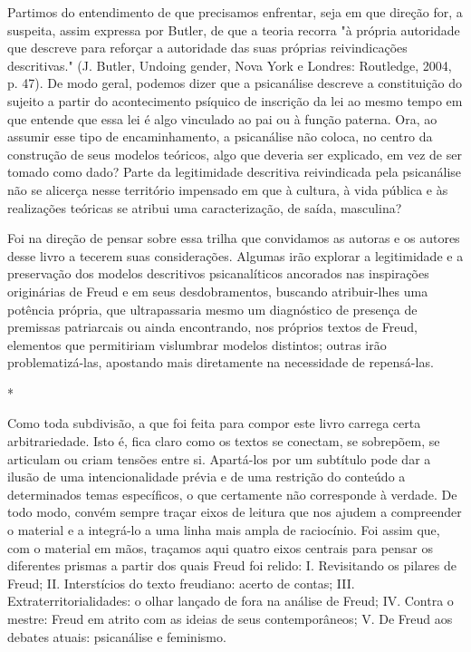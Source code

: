 Partimos do entendimento de que precisamos enfrentar, seja em que
direção for, a suspeita, assim expressa por Butler, de que a teoria
recorra "à própria autoridade que descreve para reforçar a autoridade
das suas próprias reivindicações descritivas." (J. Butler, Undoing
gender, Nova York e Londres: Routledge, 2004, p. 47). De modo geral,
podemos dizer que a psicanálise descreve a constituição do sujeito a
partir do acontecimento psíquico de inscrição da lei ao mesmo tempo em
que entende que essa lei é algo vinculado ao pai ou à função paterna.
Ora, ao assumir esse tipo de encaminhamento, a psicanálise não coloca,
no centro da construção de seus modelos teóricos, algo que deveria ser
explicado, em vez de ser tomado como dado? Parte da legitimidade
descritiva reivindicada pela psicanálise não se alicerça nesse
território impensado em que à cultura, à vida pública e às realizações
teóricas se atribui uma caracterização, de saída, masculina?

Foi na direção de pensar sobre essa trilha que convidamos as autoras e
os autores desse livro a tecerem suas considerações. Algumas irão
explorar a legitimidade e a preservação dos modelos descritivos
psicanalíticos ancorados nas inspirações originárias de Freud e em seus
desdobramentos, buscando atribuir-lhes uma potência própria, que
ultrapassaria mesmo um diagnóstico de presença de premissas patriarcais
ou ainda encontrando, nos próprios textos de Freud, elementos que
permitiriam vislumbrar modelos distintos; outras irão problematizá-las,
apostando mais diretamente na necessidade de repensá-las.

*

Como toda subdivisão, a que foi feita para compor este livro carrega
certa arbitrariedade. Isto é, fica claro como os textos se conectam, se
sobrepõem, se articulam ou criam tensões entre si. Apartá-los por um
subtítulo pode dar a ilusão de uma intencionalidade prévia e de uma
restrição do conteúdo a determinados temas específicos, o que certamente
não corresponde à verdade. De todo modo, convém sempre traçar eixos de
leitura que nos ajudem a compreender o material e a integrá-lo a uma
linha mais ampla de raciocínio. Foi assim que, com o material em mãos,
traçamos aqui quatro eixos centrais para pensar os diferentes prismas a
partir dos quais Freud foi relido: I. Revisitando os pilares de Freud;
II. Interstícios do texto freudiano: acerto de contas; III.
Extraterritorialidades: o olhar lançado de fora na análise de Freud; IV.
Contra o mestre: Freud em atrito com as ideias de seus contemporâneos;
V. De Freud aos debates atuais: psicanálise e feminismo.

